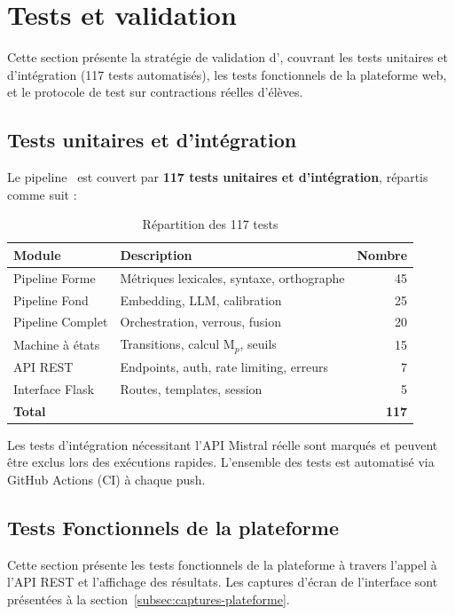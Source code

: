 \section{Tests et validation}

Cette section présente la stratégie de validation d'\AZIZA, couvrant les tests unitaires et d'intégration (117 tests automatisés), les tests fonctionnels de la plateforme web, et le protocole de test sur contractions réelles d'élèves.

\subsection{Tests unitaires et d'intégration}

Le pipeline \AZIZA\ est couvert par \textbf{117 tests unitaires et d'intégration}, répartis comme suit :

\begin{table}[H]
\centering
\caption{Répartition des 117 tests}
\label{tab:tests}
\begin{tabularx}{\textwidth}{l X r}
\toprule
\textbf{Module} & \textbf{Description} & \textbf{Nombre} \\
\midrule
Pipeline Forme & Métriques lexicales, syntaxe, orthographe & 45 \\
Pipeline Fond & Embedding, LLM, calibration & 25 \\
Pipeline Complet & Orchestration, verrous, fusion & 20 \\
Machine à états & Transitions, calcul M\(_p\), seuils & 15 \\
API REST & Endpoints, auth, rate limiting, erreurs & 7 \\
Interface Flask & Routes, templates, session & 5 \\
\midrule
\textbf{Total} & & \textbf{117} \\
\bottomrule
\end{tabularx}
\end{table}

Les tests d'intégration nécessitant l'API Mistral réelle sont marqués et peuvent être exclus lors des exécutions rapides. L'ensemble des tests est automatisé via GitHub Actions (CI) à chaque push.

\subsection{Tests Fonctionnels de la plateforme}
\label{sec:tests-fonctionnels}

Cette section présente les tests fonctionnels de la plateforme \AZIZA{} à travers l'appel à l'API REST et l'affichage des résultats. Les captures d'écran de l'interface sont présentées à la section~\ref{subsec:captures-plateforme}.

